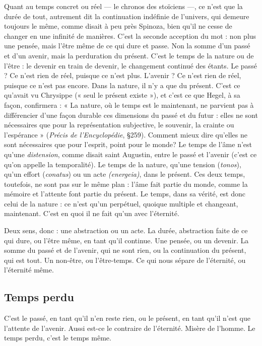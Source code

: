 Quant au temps concret ou réel — le {\it }chronos des stoïciens —, ce n’est que la
durée de tout, autrement dit la continuation indéfinie de l’univers, qui
demeure toujours le même, comme disait à peu près Spinoza, bien qu’il ne
cesse de changer en une infinité de manières. C’est la seconde acception du
mot : non plus une pensée, mais l’être même de ce qui dure et passe. Non la
somme d’un passé et d’un avenir, mais la perduration du présent. C’est le
temps de la nature ou de l’être : le devenir en train de devenir, le changement
continué des étants. Le passé ? Ce n’est rien de réel, puisque ce n’est plus.
L'avenir ? Ce n’est rien de réel, puisque ce n’est pas encore. Dans la nature, il
n’y a que du présent. C’est ce qu'avait vu Chrysippe (« seul le présent existe »),
et c’est ce que Hegel, à sa façon, confirmera : « La nature, où le temps est le
maintenant, ne parvient pas à différencier d’une façon durable ces dimensions
du passé et du futur : elles ne sont nécessaires que pour la représentation subjective,
le souvenir, la crainte ou l’espérance » ({\it Précis de l'Encyclopédie}, \S 259).
Comment mieux dire qu’elles ne sont nécessaires que pour l'esprit, point pour
le monde? Le temps de l’âme n’est qu’une {\it distension}, comme disait saint
Augustin, entre le passé et l’avenir (c’est ce qu’on appelle la temporalité). Le
temps de la nature, qu’une tension ({\it tonos}), qu’un effort ({\it conatus}) ou un acte
{\it (energeia)}, dans le présent. Ces deux temps, toutefois, ne sont pas sur le même
plan : l’âme fait partie du monde, comme la mémoire et l’attente font partie du
présent. Le temps, dans sa vérité, est donc celui de la nature : ce n’est qu’un
perpétuel, quoique multiple et changeant, {\it }maintenant. C’est en quoi il ne fait
qu’un avec l'éternité.

Deux sens, donc : une abstraction ou un acte. La durée, abstraction faite de
ce qui dure, ou l’être même, en tant qu’il continue. Une pensée, ou un devenir.
La somme du passé et de l’avenir, qui ne sont rien, ou la continuation du présent,
qui est tout. Un non-être, ou l’être-temps. Ce qui nous sépare de l’éternité,
ou l'éternité même.


\subsection{Temps perdu}
C'est le passé, en tant qu’il n’en reste rien, ou le présent, en
tant qu’il n’est que l’attente de l’avenir. Aussi est-ce le
contraire de l'éternité. Misère de l’homme. Le temps perdu, c’est le temps
même.

